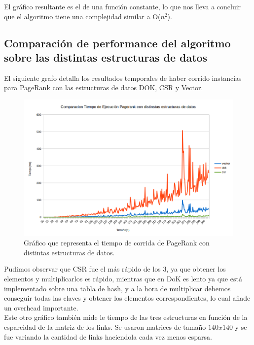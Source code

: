 El gráfico resultante es el de una función constante, lo que nos lleva a concluir que el algoritmo tiene una complejidad similar a O($n^{2}$).

\subsection{Comparación de performance del algoritmo sobre las distintas estructuras de datos}

El siguiente grafo detalla los resultados temporales de haber corrido instancias para PageRank con las estructuras de datos DOK, CSR y Vector.

\begin{figure}[h]
  \includegraphics[scale=0.4]{imagenes/comparacion-tiempo-ejecucion-csr-dok-vector.png}
   \caption{Gráfico que representa el tiempo de corrida de PageRank con distintas estructuras de datos.}
  \label{fig:img1}
\end{figure}

Pudimos observar que CSR fue el más rápido de los 3, ya que obtener los elementos y multiplicarlos es rápido, mientras que en DoK es lento ya que está implementado sobre una tabla de hash, y a la hora de multiplicar debemos conseguir todas las claves y obtener los elementos correspondientes, lo cual añade un overhead importante.\\




Este otro gráfico también mide le tiempo de las tres estructuras en función de la esparcidad de la matriz de los links. Se usaron matrices de tamaño $140x140$ y se fue variando la cantidad de links haciendola cada vez menos esparsa.\\


